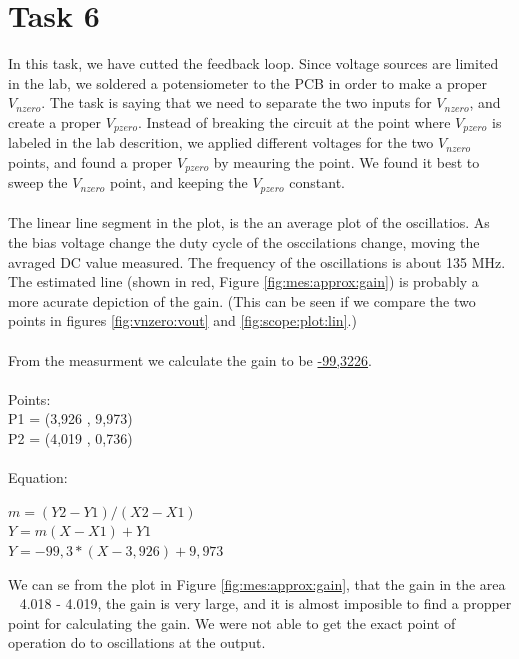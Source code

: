 \documentclass[a4paper,english,11pt]{article}
\begin{document}
\section{Task 6}
In this task, we have cutted the feedback loop. Since voltage sources are limited in the lab, we soldered a potensiometer to the PCB
in order to make a proper $V_{nzero}$. The task is saying that we need to separate the two inputs for $V_{nzero}$, and create a proper $V_{pzero}$.
Instead of breaking the circuit at the point where $V_{pzero}$ is labeled in the lab descrition, we applied different voltages for the two 
$V_{nzero}$ points, and found a proper $V_{pzero}$ by meauring the point. We found it best to sweep the $V_{nzero}$ point, and keeping the $V_{pzero}$ constant.
\\
\\
The linear line segment in the plot, is the an average plot of the oscillatios. As the bias voltage change the duty cycle of the osccilations change, moving the 
avraged DC value measured. The frequency of the oscillations is about 135 MHz. 
The estimated line (shown in red, Figure \ref{fig:mes:approx:gain}) is probably a more acurate depiction of the gain.
(This can be seen if we compare the two points in figures \ref{fig:vnzero:vout} and \ref{fig:scope:plot:lin}.)\\
\\
From the measurment we calculate the gain to be \underline{-99,3226}.\\
\\
Points:\\
P1 = (3,926 , 9,973)\\
P2 = (4,019 , 0,736)\\
\\
Equation:
\begin{center}
$m = (Y2 - Y1) / (X2 - X1)$\\
$Y = m(X - X1) + Y1$\\
$Y = -99,3 * (X - 3,926) + 9,973$
\end{center}
We can se from the plot in Figure \ref{fig:mes:approx:gain}, that the gain in the area ~ 4.018 - 4.019, the gain is very large, and it is almost imposible to find a propper
point for calculating the gain. We were not able to get the exact point of operation do to oscillations at the output. 
\end{document}
